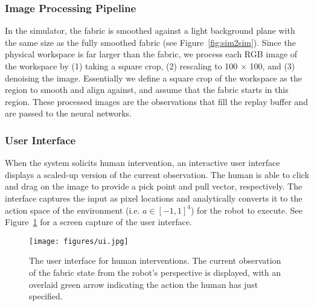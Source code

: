 \subsubsection{Image Processing Pipeline}
In the simulator, the fabric is smoothed against a light background plane with the same size as the fully smoothed fabric (see Figure~\ref{fig:sim2sim}). Since the physical workspace is far larger than the fabric, we process each RGB image of the workspace by (1) taking a square crop, (2) rescaling to 100 $\times$ 100, and (3) denoising the image. Essentially we define a square crop of the workspace as the region to smooth and align against, and assume that the fabric starts in this region. These processed images are the observations that fill the replay buffer and are passed to the neural networks. 

\subsubsection{User Interface}
When the system solicits human intervention, an interactive user interface displays a scaled-up version of the current observation. The human is able to click and drag on the image to provide a pick point and pull vector, respectively. The interface captures the input as pixel locations and analytically converts it to the action space of the environment (i.e. $a \in [-1,1]^4$) for the robot to execute. See Figure~\ref{fig:ui} for a screen capture of the user interface.

\begin{figure}[t]
\center
\texttt{[image: figures/ui.jpg]}
\caption{
The user interface for human interventions. The current observation of the fabric state from the robot's perspective is displayed, with an overlaid green arrow indicating the action the human has just specified.}
\label{fig:ui}
\end{figure}

